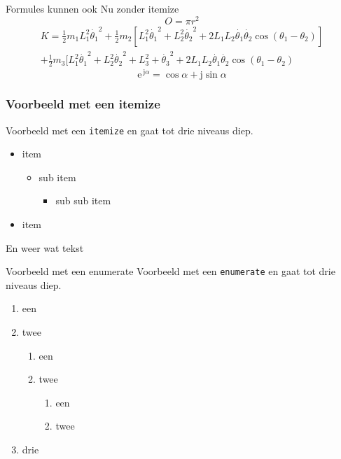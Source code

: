 \documentclass[fleqn,aspectratio=169,dutch]{beamer}
\begin{document}
\begin{frame}{Formules kunnen ook}
Nu zonder itemize
\begin{equation*}
O=\pi r^2
\end{equation*}
\begin{multline*}  
K=\displaystyle{\frac{1}{2}m_1 L_1^2 \dot{\theta_1}^2+\frac{1}{2} m_2[L_1^2 \dot{\theta_1}^2+L_2^2 \dot{\theta_2}^2+2 L_1 L_2 \dot{\theta_1}\dot{\theta_2}\cos(\theta_1-\theta_2)]} \\
 \displaystyle{+\frac{1}{2}m_3[L_1^2 \dot{\theta_1}^2+L_2^2 \dot{\theta_2}^2+L_3^2+ \dot{\theta_3}^2+2 L_1 L_2 \dot{\theta_1}\dot{\theta_2}\cos(\theta_1-\theta_2)}
\end{multline*}
\begin{equation*}
\mathrm{e}^{\, \mathrm{j}\alpha} = \cos \alpha + \mathrm{j} \sin \alpha
\end{equation*}
\end{frame}

\begin{frame}
\frametitle{Voorbeeld met een itemize}
Voorbeeld met een \texttt{itemize} en gaat tot drie niveaus diep.
\begin{itemize}
\item item
\begin{itemize}
\item sub item
\begin{itemize}
\item sub sub item
\end{itemize}
\end{itemize}
\item item
\end{itemize}
En weer wat tekst
\end{frame}

\begin{frame}{Voorbeeld met een enumerate}
Voorbeeld met een \texttt{enumerate} en gaat tot drie niveaus diep.
\begin{enumerate}
\item een
\item twee
\begin{enumerate}
\item een
\item twee
\begin{enumerate}
\item een
\item twee
\end{enumerate}
\end{enumerate}
\item drie
\end{enumerate}
\end{frame}
\end{document}
